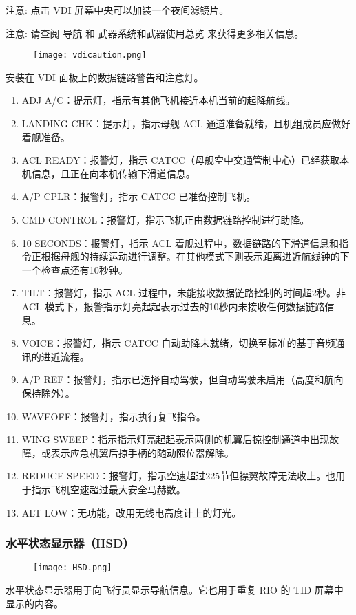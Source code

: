 注意:	点击 VDI 屏幕中央可以加装一个夜间滤镜片。

注意:	请查阅 导航 和 武器系统和武器使用总览 来获得更多相关信息。

\begin{figure}[htb]
	\centering
	\texttt{[image: vdicaution.png]}
\end{figure}
安装在 VDI 面板上的数据链路警告和注意灯。

\begin{enumerate}
	\item ADJ A/C：提示灯，指示有其他飞机接近本机当前的起降航线。
	\item LANDING CHK：提示灯，指示母舰 ACL 通道准备就绪，且机组成员应做好着舰准备。
	\item ACL READY：报警灯，指示 CATCC（母舰空中交通管制中心）已经获取本机信息，且正在向本机传输下滑道信息。
	\item A/P CPLR：报警灯，指示 CATCC 已准备控制飞机。
	\item CMD CONTROL：报警灯，指示飞机正由数据链路控制进行助降。
	\item 10 SECONDS：报警灯，指示 ACL 着舰过程中，数据链路的下滑道信息和指令正根据母舰的持续运动进行调整。在其他模式下则表示距离进近航线钟的下一个检查点还有10秒钟。
	\item TILT：报警灯，指示 ACL 过程中，未能接收数据链路控制的时间超2秒。非 ACL 模式下，报警指示灯亮起起表示过去的10秒内未接收任何数据链路信息。
	\item VOICE：报警灯，指示 CATCC 自动助降未就绪，切换至标准的基于音频通讯的进近流程。
	\item A/P REF：报警灯，指示已选择自动驾驶，但自动驾驶未启用（高度和航向保持除外）。
	\item WAVEOFF：报警灯，指示执行复飞指令。
	\item WING SWEEP：指示指示灯亮起起表示两侧的机翼后掠控制通道中出现故障，或表示应急机翼后掠手柄的随动限位器解除。
	\item REDUCE SPEED：报警灯，指示空速超过225节但襟翼故障无法收上。也用于指示飞机空速超过最大安全马赫数。
	\item ALT LOW：无功能，改用无线电高度计上的灯光。
\end{enumerate}

\subsubsection{水平状态显示器（HSD）}

\begin{figure}[htb]
	\centering
	\texttt{[image: HSD.png]}
\end{figure}
水平状态显示器用于向飞行员显示导航信息。它也用于重复 RIO 的 TID 屏幕中显示的内容。

